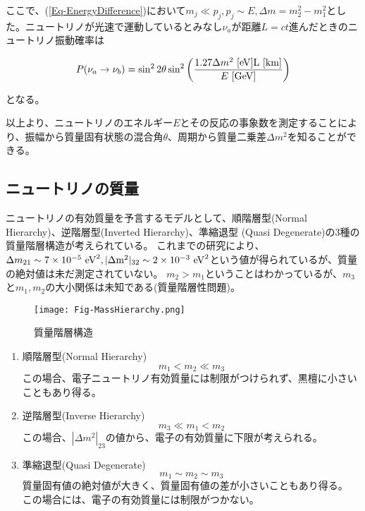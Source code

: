 \documentclass[a4paper,10pt]{jreport}
\begin{document}
ここで、(\ref{Eq-EnergyDifference})において$m_j\ll p_j,p_j\sim E,\Delta m=m_2^2-m_1^2$とした。ニュートリノが光速で運動しているとみなし$\nu_a$が距離$L=ct$進んだときのニュートリノ振動確率は

\begin{equation} \label{P_NeutrinoOscillation_c}
P(\nu_a\to\nu_b) = \sin^22\theta\sin^2\left(\frac{1.27\Delta m^2\ [\rm{eV}] L\ [\rm{km}]}{E\ [\rm{GeV}]}\right)
\end{equation}

となる\cite{Syuron_2010}。

以上より、ニュートリノのエネルギー$E$とその反応の事象数を測定することにより、振幅から質量固有状態の混合角$\theta$、周期から質量二乗差$\Delta m^2$を知ることができる。




\subsection{ニュートリノの質量}

ニュートリノの有効質量を予言するモデルとして、順階層型(Normal Hierarchy)、逆階層型(Inverted Hierarchy)、準縮退型 (Quasi Degenerate)の3種の質量階層構造が考えられている。
これまでの研究により、$\Delta m_{21}\sim 7\times10^{-5}\ \rm{eV}^2,|\Delta m^2|_{32}\sim 2\times10^{-3}\ \rm{eV}^2$という値が得られているが、質量の絶対値は未だ測定されていない。
$m_2>m_1$ということはわかっているが、$m_3$と$m_1,m_2$の大小関係は未知である(質量階層性問題)。

\begin{figure}[H]
	\center
	\texttt{[image: Fig-MassHierarchy.png]}
	\caption{質量階層構造} \label{Fig-MassHierarchy.png}
\end{figure}

\begin{enumerate}
	\item 順階層型(Normal Hierarchy) \\
	\begin{equation}
		m_1 < m_2 \ll m_3
	\end{equation}
	この場合、電子ニュートリノ有効質量には制限がつけられず、黒檀に小さいこともあり得る。
	
	\item 逆階層型(Inverse Hierarchy) \\
	\begin{equation}
		m_3 \ll m_1 < m_2
	\end{equation}
	この場合、$|\Delta m^2|_{23}$の値から、電子の有効質量に下限が考えられる。
	
	\item 準縮退型(Quasi Degenerate) \\
	\begin{equation}
		m_1 \sim m_2 \sim m_3
	\end{equation}
	質量固有値の絶対値が大きく、質量固有値の差が小さいこともあり得る。
	この場合には、電子の有効質量には制限がつかない。
	
\end{enumerate}
\end{document}
